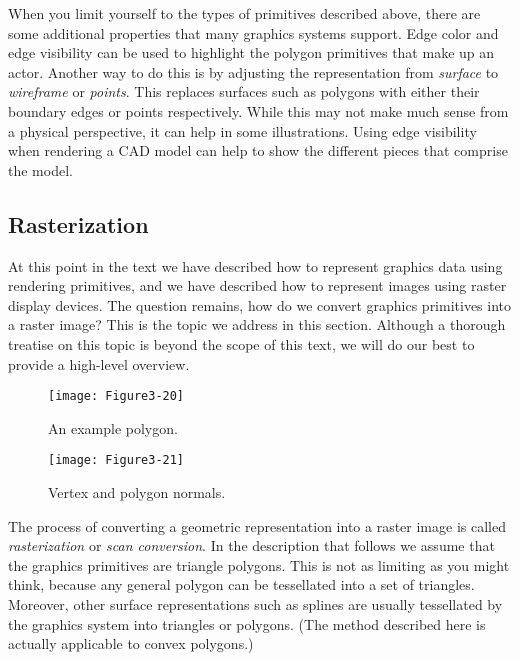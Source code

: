 When you limit yourself to the types of primitives described above, there are some additional properties that many graphics systems support. Edge color and edge visibility can be used to highlight the polygon primitives that make up an actor. Another way to do this is by adjusting the representation from \emph{surface} to \emph{wireframe} or \emph{points}. This replaces surfaces such as polygons with either their boundary edges or points respectively. While this may not make much sense from a physical perspective, it can help in some illustrations. Using edge visibility when rendering a CAD model can help to show the different pieces that comprise the model.

\subsection{Rasterization}

At this point in the text we have described how to represent graphics data using rendering primitives, and we have described how to represent images using raster display devices. The question remains, how do we convert graphics primitives into a raster image? This is the topic we address in this section. Although a thorough treatise on this topic is beyond the scope of this text, we will do our best to provide a high-level overview.

\begin{figure}[!htb]
  \centering
  \texttt{[image: Figure3-20]}\\
  \caption{An example polygon.}\label{fig:Figure3-20}
\end{figure}

\begin{figure}[!htb]
  \centering
  \texttt{[image: Figure3-21]}\\
  \caption{Vertex and polygon normals.}\label{fig:Figure3-21}
\end{figure}

The process of converting a geometric representation into a raster image is called \emph{rasterization} or \emph{scan conversion}. In the description that follows we assume that the graphics primitives are triangle polygons. This is not as limiting as you might think, because any general polygon can be tessellated into a set of triangles. Moreover, other surface representations such as splines are usually tessellated by the graphics system into triangles or polygons. (The method described here is actually applicable to convex polygons.)

